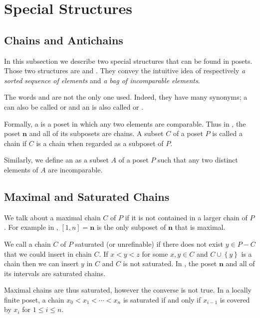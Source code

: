 \section{Special Structures}

\subsection*{Chains and Antichains}

In this subsection we describe two special structures that can be found in
posets. Those two structures are  and .
They convey the intuitive idea of respectively \emph{a sorted sequence of
elements} and \emph{a bag of incomparable elements}.

The words  and  are not the only one used.
Indeed, they have many synonyms; a  can also be called
 or  and an
 is also called  or
.


Formally, a  is a poset in which any two elements are
comparable. Thus in , the poset $\bm{n}$ and all of its
subposets are chains. A subset $C$ of a poset $P$ is called a chain if $C$ is a
chain when regarded as a subposet of $P$.

Similarly, we define an  as a subset $A$ of a poset $P$ such
that any two distinct elements of $A$ are incomparable.

\subsection*{Maximal and Saturated Chains}

We talk about a maximal chain $C$ of $P$ if it is not contained in a larger
chain of $P$. For example in , $[1, n] = \bm{n}$ is the
only subposet of $\bm{n}$ that is maximal.

We call a chain $C$ of $P$ saturated (or unrefinable) if there does not exist
$y \in P - C$ that we could insert in chain $C$. If $x < y < z$ for some $x, y
\in C$ and $C \cup \left\{{y}\right\}$ is a chain then we can insert $y$ in $C$
and $C$ is not saturated. In , the poset $\bm{n}$ and all
of its intervals are saturated chains.

Maximal chains are thus saturated, however the converse is not true. In a
locally finite poset, a chain $x_0 < x_1 < \cdots < x_n$ is saturated if and
only if $x_{i-1}$ is covered by $x_i$ for $1 \le i \le n$.


